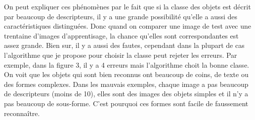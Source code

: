 \documentclass[french,12pt,a4paper,oneside,notitlepage]{report}
\begin{document}
On peut expliquer ces phénomènes par le fait que si la classe des objets est décrit par beaucoup de descripteurs, il y a une grande possibilité
qu'elle a aussi des caractéristiques distinguées. Donc quand on comparer une image de test avec une trentaine d'images d'apprentisage, la chance
qu'elles sont correspondantes est assez grande. Bien sur, il y a aussi des fautes, cependant dans la plupart de cas l'algorithme que je propose 
pour choisir la classe peut rejeter les erreurs. Par exemple, dans la figure 3, il y a 4 erreurs mais l'algorithme choit la bonne classe. On voit que
les objets qui sont bien reconnus ont beaucoup de coins, de texte ou des formes complexes.
Dans les mauvais exemples, chaque image a pas beaucoup de descripteurs (moins de 10), elles sont des images des objets simples et il n'y a pas
beaucoup de sous-forme. C'est pourquoi ces formes sont facile de faussement reconnaître.
\end{document}
